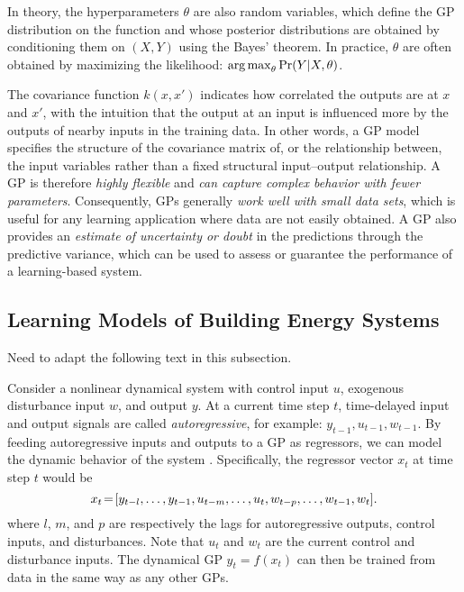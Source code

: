 In theory, the hyperparameters $\theta$ are also random variables, which define the GP distribution on the function and whose posterior distributions are obtained by conditioning them on $(X,Y)$ using the Bayes' theorem.
In practice, $\theta$ are often obtained by maximizing the likelihood: \(\operatorname*{arg\,max}_\theta \Pr(Y \vert X, \theta)\).

The covariance function \(k(x,x')\) indicates how correlated the outputs are at \(x\) and \(x'\), with the intuition that the output at an input is influenced more by the outputs of nearby inputs in the training data. 
In other words, a GP model specifies the structure of the covariance matrix of, or the relationship between, the input variables rather than a fixed structural input--output relationship.
A GP is therefore \emph{highly flexible} and \emph{can capture complex behavior with fewer parameters}.
Consequently, GPs generally \emph{work well with small data sets}, which is useful for any learning application where data are not easily obtained.
A GP also provides an \emph{estimate of uncertainty or doubt} in the predictions through the predictive variance, which can be used to assess or guarantee the performance of a learning-based system.
\fi

\subsection{Learning Models of Building Energy Systems} %
\label{sec:modeling:building}

\iffalse
\begin{todo}
Need to adapt the following text in this subsection.
\end{todo}


Consider a nonlinear dynamical system with control input \(u\), exogenous disturbance input \(w\), and output \(y\).
At a current time step $t$, time-delayed input and output signals are called \emph{autoregressive}, for example: $y_{t-1}, u_{t-1}, w_{t-1}$.
By feeding autoregressive inputs and outputs to a GP as regressors, we can model the dynamic behavior of the system \cite{Kocijan2016}.
Specifically, the regressor vector $x_{t}$ at time step $t$ would be
\begin{equation*}
x_{t}\!=\![y_{t-l}, \dots, y_{t-1}, u_{t-m}, \dots, u_t, w_{t-p}, \dots, w_{t-1}, w_t] \text.
\end{equation*}
where \(l\), \(m\), and \(p\) are respectively the lags for autoregressive outputs, control inputs, and disturbances.
Note that \(u_t\) and \(w_t\) are the current control and disturbance inputs.
The dynamical GP
\begin{math}
y_{t} = f(x_t)
\end{math}
can then be trained from data in the same way as any other GPs.

